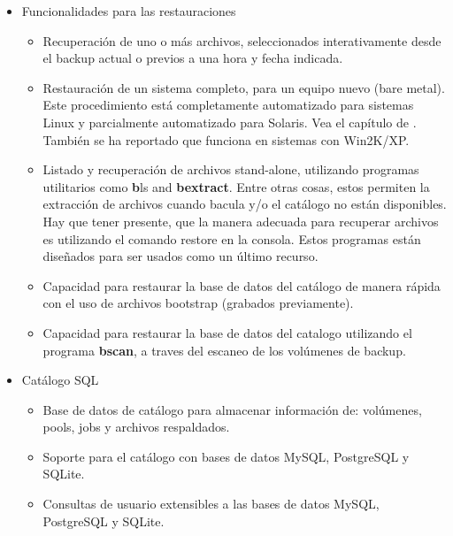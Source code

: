 \begin{itemize}
\item Funcionalidades para las restauraciones
   \begin{itemize}
   \item Recuperación de uno o más archivos, seleccionados interativamente desde el backup
      actual o previos a una hora y fecha indicada.  
   \item Restauración de un sistema completo, para un equipo nuevo (bare metal). 
      Este procedimiento está completamente automatizado para sistemas Linux y 
      parcialmente automatizado para Solaris. Vea el capítulo de 
      . También se ha reportado que 
      funciona en sistemas con Win2K/XP.   
   \item Listado y recuperación de archivos stand-alone, utilizando programas utilitarios como {\textbf bls} and  
      \textbf {bextract}. Entre otras cosas, estos permiten la extracción
      de archivos cuando bacula y/o el catálogo no están disponibles. Hay que tener presente,
      que la manera adecuada para recuperar archivos es utilizando el comando restore en
      la consola. Estos programas están diseñados para ser usados como un último recurso. 
   \item Capacidad para restaurar la base de datos del catálogo de manera rápida con el uso
      de archivos bootstrap (grabados previamente).
   \item Capacidad para restaurar la base de datos del catalogo utilizando el programa 
      \textbf {bscan}, a traves del escaneo de los volúmenes de backup.  
   \end{itemize}

\item Catálogo SQL
   \begin{itemize}
   \item Base de datos de catálogo para almacenar información de: volúmenes, pools, jobs y
      archivos respaldados. 
   \item Soporte para el catálogo con bases de datos MySQL, PostgreSQL y SQLite.  
   \item Consultas de usuario extensibles a las bases de datos MySQL, PostgreSQL y SQLite.  
   \end{itemize}


\end{itemize}
